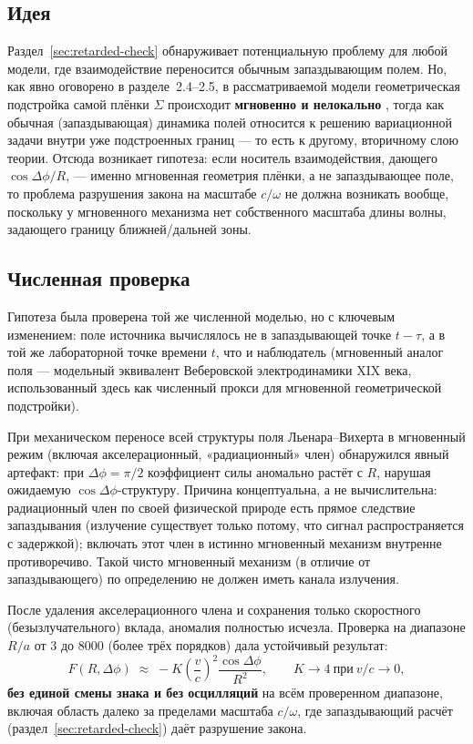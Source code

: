 \documentclass[12pt,a4paper]{article}
\begin{document}
\subsection{Идея}

Раздел~\ref{sec:retarded-check} обнаруживает потенциальную проблему для
любой модели, где взаимодействие переносится обычным запаздывающим
полем. Но, как явно оговорено в разделе~2.4--2.5, в рассматриваемой
модели геометрическая подстройка самой плёнки $\Sigma$ происходит
\textbf{мгновенно и нелокально} \cite{coax}, тогда как обычная (запаздывающая)
динамика полей относится к решению вариационной задачи внутри уже
подстроенных границ --- то есть к другому, вторичному слою теории.
Отсюда возникает гипотеза: если носитель взаимодействия, дающего
$\cos\Delta\phi/R$, --- именно мгновенная геометрия плёнки, а не
запаздывающее поле, то проблема разрушения закона на масштабе $c/\omega$
не должна возникать вообще, поскольку у мгновенного механизма нет
собственного масштаба длины волны, задающего границу
ближней/дальней зоны.

\subsection{Численная проверка}

Гипотеза была проверена той же численной моделью, но с ключевым
изменением: поле источника вычислялось не в запаздывающей точке
$t-\tau$, а в той же лабораторной точке времени $t$, что и наблюдатель
(мгновенный аналог поля --- модельный эквивалент Веберовской
электродинамики XIX века, использованный здесь как численный прокси
для мгновенной геометрической подстройки).

При механическом переносе всей структуры поля Льенара--Вихерта в
мгновенный режим (включая акселерационный, «радиационный» член)
обнаружился явный артефакт: при $\Delta\phi=\pi/2$ коэффициент силы
аномально растёт с $R$, нарушая ожидаемую $\cos\Delta\phi$-структуру.
Причина концептуальна, а не вычислительна: радиационный член по своей
физической природе есть прямое следствие запаздывания (излучение
существует только потому, что сигнал распространяется с задержкой);
включать этот член в истинно мгновенный механизм внутренне
противоречиво. Такой чисто мгновенный механизм (в отличие от
запаздывающего) по определению не должен иметь канала излучения.

После удаления акселерационного члена и сохранения только
скоростного (безызлучательного) вклада, аномалия полностью исчезла.
Проверка на диапазоне $R/a$ от $3$ до $8000$ (более трёх порядков) дала
устойчивый результат:
\begin{equation}
F(R,\Delta\phi)\;\approx\;-K\left(\frac{v}{c}\right)^2\frac{\cos\Delta\phi}{R^2},
\qquad K\to4\ \text{при}\ v/c\to0,
\label{eq:instant-law}
\end{equation}
\textbf{без единой смены знака и без осцилляций} на всём проверенном
диапазоне, включая область далеко за пределами масштаба $c/\omega$, где
запаздывающий расчёт (раздел~\ref{sec:retarded-check}) даёт разрушение
закона.
\end{document}
